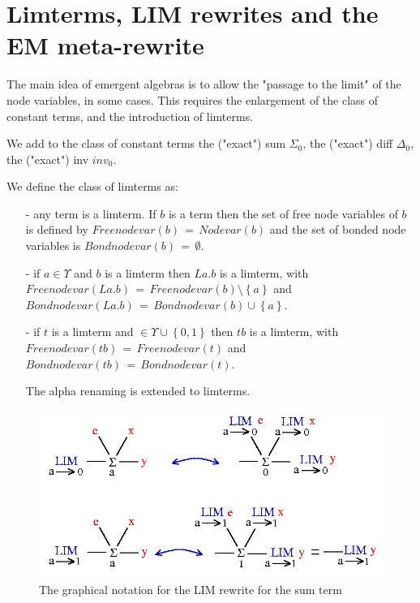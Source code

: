 \documentclass{article}
\begin{document}
\section{Limterms, LIM rewrites and the EM meta-rewrite}
\label{emr}


The main idea of emergent algebras  is to allow the "passage to the limit" of the node variables, in some cases. This requires the enlargement of the class of constant terms, and the introduction of limterms. 

\begin{definition}
We add to the class of constant terms the ("exact") sum $\displaystyle \Sigma_{0}$,  the ("exact") diff $\displaystyle \Delta_{0}$, the ("exact") inv $\displaystyle inv_{0}$. 

We define the class of limterms as: 
\begin{enumerate}
\item[-] any term is a limterm. If $b$ is a term then the set of free node variables of $b$ is defined by $\displaystyle Freenodevar(b) \, = \, Nodevar(b)$ and the set of bonded node variables is  $Bondnodevar(b) \, = \, \emptyset$.
\item[-] if $a \in \Upsilon$ and $b$ is a limterm  then $\displaystyle L a. b$ is a limterm, with $\displaystyle Freenodevar(La.b) \, = \, Freenodevar(b) \setminus \left\{ a \right\}$ and $Bondnodevar(La.b) \, = \, Bondnodevar(b) \cup \left\{ a \right\}$.
\item[-] if $t$ is a limterm and $\displaystyle \in \Upsilon \cup \left\{ 0,1 \right\}$ then $t b$ is a limterm, with $\displaystyle Freenodevar(t b) \, = \, Freenodevar(t)$ and $\displaystyle Bondnodevar(t b) \, = \, Bondnodevar(t)$. 

The alpha renaming is extended to limterms. 
\end{enumerate}
\end{definition}

\begin{figure}[h]\centerline{\includegraphics[width=120mm]{jpg/asum-em-alt.jpg}}  \caption{ The graphical notation for the LIM rewrite for the sum term} \label{asum-em-alt-fig} \end{figure}
\end{document}
